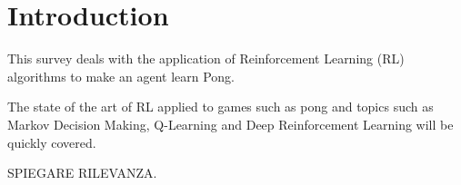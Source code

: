 \section{Introduction}

This survey deals with the application of Reinforcement Learning (RL) algorithms to make an agent learn Pong.

The state of the art of RL applied to games such as pong and topics such as Markov Decision Making, Q-Learning and Deep Reinforcement Learning will be quickly covered.

SPIEGARE RILEVANZA.



